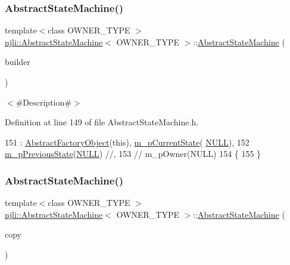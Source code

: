 \subsubsection{\texorpdfstring{Abstract\+State\+Machine()}{AbstractStateMachine()}\hspace{0.1cm}{\footnotesize\ttfamily [2/3]}}
{\footnotesize\ttfamily template$<$class O\+W\+N\+E\+R\+\_\+\+T\+Y\+PE $>$ \\
\mbox{\hyperlink{classnjli_1_1_abstract_state_machine}{njli\+::\+Abstract\+State\+Machine}}$<$ O\+W\+N\+E\+R\+\_\+\+T\+Y\+PE $>$\+::\mbox{\hyperlink{classnjli_1_1_abstract_state_machine}{Abstract\+State\+Machine}} (\begin{DoxyParamCaption}\item[{const \mbox{\hyperlink{classnjli_1_1_abstract_builder}{Abstract\+Builder}} \&}]{builder }\end{DoxyParamCaption})}

$<$\#\+Description\#$>$ 

Definition at line 149 of file Abstract\+State\+Machine.\+h.


\begin{DoxyCode}
151       : \mbox{\hyperlink{classnjli_1_1_abstract_factory_object_a4f7ae7bf09c7c9426e7d6023f7fd8dec}{AbstractFactoryObject}}(\textcolor{keyword}{this}), \mbox{\hyperlink{classnjli_1_1_abstract_state_machine_ae82332bd955b01fa48471ec0613e8207}{m\_pCurrentState}}(
      \mbox{\hyperlink{_abstract_state_8h_a070d2ce7b6bb7e5c05602aa8c308d0c4}{NULL}}),
152         \mbox{\hyperlink{classnjli_1_1_abstract_state_machine_a43a2c2c7a36aba24176e5d6d82ab9f45}{m\_pPreviousState}}(\mbox{\hyperlink{_abstract_state_8h_a070d2ce7b6bb7e5c05602aa8c308d0c4}{NULL}}) \textcolor{comment}{//,}
153   \textcolor{comment}{//    m\_pOwner(NULL)}
154   \{
155   \}
\end{DoxyCode}
\mbox{\label{classnjli_1_1_abstract_state_machine_abf78c27c17c84ed7e6e372714e7a87fc}} 
\subsubsection{\texorpdfstring{Abstract\+State\+Machine()}{AbstractStateMachine()}\hspace{0.1cm}{\footnotesize\ttfamily [3/3]}}
{\footnotesize\ttfamily template$<$class O\+W\+N\+E\+R\+\_\+\+T\+Y\+PE $>$ \\
\mbox{\hyperlink{classnjli_1_1_abstract_state_machine}{njli\+::\+Abstract\+State\+Machine}}$<$ O\+W\+N\+E\+R\+\_\+\+T\+Y\+PE $>$\+::\mbox{\hyperlink{classnjli_1_1_abstract_state_machine}{Abstract\+State\+Machine}} (\begin{DoxyParamCaption}\item[{const \mbox{\hyperlink{classnjli_1_1_abstract_state_machine}{Abstract\+State\+Machine}}$<$ O\+W\+N\+E\+R\+\_\+\+T\+Y\+PE $>$ \&}]{copy }\end{DoxyParamCaption})}

